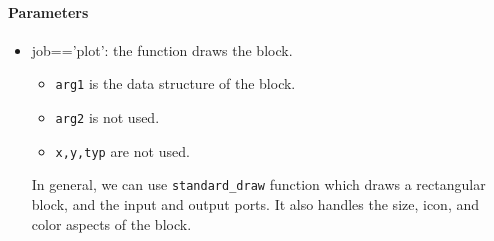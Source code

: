 \documentclass{article}
\begin{document}
\paragraph{Parameters}
\begin{itemize}
\item job=='plot': the function draws the block. 
  \begin{itemize}
  \item {\tt arg1} is the data structure of the block.
  \item {\tt arg2} is not used.
  \item {\tt x,y,typ} are not used.
  \end{itemize}
In general, we can use {\tt standard\_draw} \label{stdd} function
which  draws a rectangular block, and the input and output ports. It
also handles the size, icon, and color aspects of the block.


\end{itemize}
\end{document}
